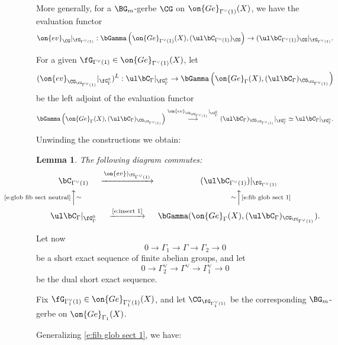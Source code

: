 \documentclass[9pt]{amsart}
\newtheorem{lem}[subsubsection]{Lemma}
\theoremstyle{remark}
\theoremstyle{definition}
\theoremstyle{remark}
\numberwithin{equation}{section}
\begin{document}
\medskip

More generally, for a $\BG_m$-gerbe $\CG$ on $\on{Ge}_{\Gamma^\vee(1)}(X)$, we have the evaluation functor
$$\on{ev}_\CG|_{\fG_{\Gamma^\vee(1)}}:\bGamma\left(\on{Ge}_{\Gamma^\vee(1)}(X),(\ul\bC_{\Gamma^\vee(1)})_\CG\right)\to
(\ul\bC_{\Gamma^\vee(1)})_\CG|_{\fG_{\Gamma^\vee(1)}}.$$

\sssec{}

For a given $\fG_{\Gamma^\vee(1)}\in \on{Ge}_{\Gamma^\vee(1)}(X)$, let 
\begin{equation} \label{e:insert 1}
(\on{ev}_{\CG_{\fG_{\Gamma^\vee(1)}}}|_{\fG^0_{\Gamma}})^L:\ul\bC_{\Gamma}|_{\fG^0_{\Gamma}}\to 
\bGamma\left(\on{Ge}_{\Gamma}(X),(\ul\bC_{\Gamma})_{\CG_{\fG_{\Gamma^\vee(1)}}}\right)
\end{equation}
be the left adjoint of the evaluation functor
$$\bGamma\left(\on{Ge}_{\Gamma}(X),(\ul\bC_{\Gamma})_{\CG_{\fG_{\Gamma^\vee(1)}}}\right)
\overset{\on{ev}_{\CG_{\fG_{\Gamma^\vee(1)}}}|_{\fG^0_{\Gamma}}}\longrightarrow 
(\ul\bC_{\Gamma})_{\CG_{\fG_{\Gamma^\vee(1)}}}|_{\fG^0_{\Gamma}}\simeq \ul\bC_{\Gamma}|_{\fG^0_{\Gamma}}.$$

\sssec{}

Unwinding the constructions we obtain:

\begin{lem} \label{l:fiber and global sects}
The following diagram commutes:
$$
\CD
\bC_{\Gamma^\vee(1)} @>{\on{ev}|_{\fG_{\Gamma^\vee(1)}}}>> (\ul\bC_{\Gamma^\vee(1)})|_{\fG_{\Gamma^\vee(1)}} \\
@A{\text{\eqref{e:glob fib sect neutral}}}A{\sim}A @A{\sim}A{\text{\eqref{e:fib glob sect 1}}}A \\
\ul\bC_{\Gamma}|_{\fG^0_{\Gamma}} @>{\text{\eqref{e:insert 1}}}>> \bGamma(\on{Ge}_{\Gamma}(X),(\ul\bC_{\Gamma})_{\CG_{\fG_{\Gamma^\vee(1)}}}).
\endCD
$$
\end{lem}

\sssec{}

Let now
$$0\to \Gamma_1\to \Gamma\to \Gamma_2\to 0$$
be a short exact sequence of finite abelian groups, and let
$$0\to \Gamma_2^\vee\to \Gamma^\vee\to \Gamma_1^\vee\to 0$$
be the dual short exact sequence. 

\medskip

Fix $\fG_{\Gamma_1^\vee(1)}\in \on{Ge}_{\Gamma_1^\vee(1)}(X)$, and let 
$\CG_{\fG_{\Gamma_1^\vee(1)}}$ be the corresponding $\BG_m$-gerbe on $\on{Ge}_{\Gamma_1}(X)$. 

\medskip

Generalizing \eqref{e:fib glob sect 1}, we have:
\end{document}
